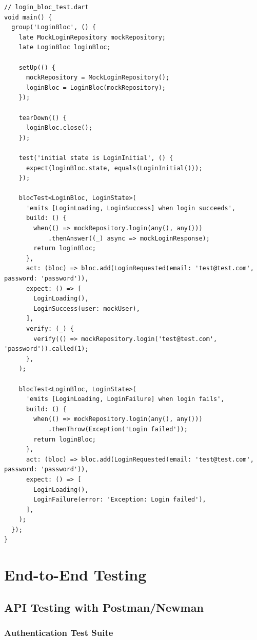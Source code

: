 \begin{lstlisting}
// login_bloc_test.dart
void main() {
  group('LoginBloc', () {
    late MockLoginRepository mockRepository;
    late LoginBloc loginBloc;

    setUp(() {
      mockRepository = MockLoginRepository();
      loginBloc = LoginBloc(mockRepository);
    });

    tearDown(() {
      loginBloc.close();
    });

    test('initial state is LoginInitial', () {
      expect(loginBloc.state, equals(LoginInitial()));
    });

    blocTest<LoginBloc, LoginState>(
      'emits [LoginLoading, LoginSuccess] when login succeeds',
      build: () {
        when(() => mockRepository.login(any(), any()))
            .thenAnswer((_) async => mockLoginResponse);
        return loginBloc;
      },
      act: (bloc) => bloc.add(LoginRequested(email: 'test@test.com', password: 'password')),
      expect: () => [
        LoginLoading(),
        LoginSuccess(user: mockUser),
      ],
      verify: (_) {
        verify(() => mockRepository.login('test@test.com', 'password')).called(1);
      },
    );

    blocTest<LoginBloc, LoginState>(
      'emits [LoginLoading, LoginFailure] when login fails',
      build: () {
        when(() => mockRepository.login(any(), any()))
            .thenThrow(Exception('Login failed'));
        return loginBloc;
      },
      act: (bloc) => bloc.add(LoginRequested(email: 'test@test.com', password: 'password')),
      expect: () => [
        LoginLoading(),
        LoginFailure(error: 'Exception: Login failed'),
      ],
    );
  });
}
\end{lstlisting}

\section{End-to-End Testing}

\subsection{API Testing with Postman/Newman}

\subsubsection{Authentication Test Suite}

